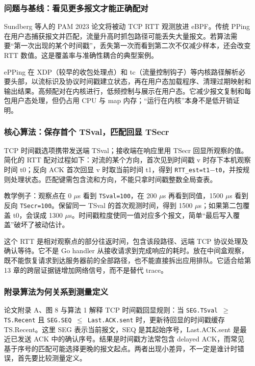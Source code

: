 \documentclass[UTF8,fontset=fandol,openany,11pt]{ctexbook}
\begin{document}
\subsubsection{问题与基线：看见更多报文才能正确配对}
Sundberg 等人的 PAM 2023 论文将被动 TCP RTT 观测放进 eBPF。传统 PPing 在用户态捕获报文并匹配，流量升高时抓包路径可能丢失大量报文。若算法需要“第一次出现的某个时间戳”，丢失第一次而看到第二次不仅减少样本，还会改变 RTT 数值。这是覆盖率与准确性耦合的典型案例。\cite{paper-epping}

ePPing 在 XDP（较早的收包处理点）和 tc（流量控制钩子）等内核路径解析必要头部，以流标识及协议时间戳建立状态，再在用户态加载程序、清理过期映射和输出结果。高频配对在内核进行，低频控制与展示在用户态。它减少报文复制和每包用户态处理，但仍占用 CPU 与 map 内存；“运行在内核”本身不是低开销证明。

\subsubsection{核心算法：保存首个 TSval，匹配回显 TSecr}
TCP 时间戳选项携带发送端 TSval；接收端在响应里用 TSecr 回显所观察的值。简化的 RTT 配对过程如下：对流的某个方向，首次见到时间戳 v 时存下本机观察时间 t0；反向 ACK 首次回显 v 时取当前时间 t1，得到 \texttt{RTT\_\allowbreak{}est=t1\ensuremath{-}t0}，并按规则处理状态。匹配键需包含流和方向，不能只拿时间戳整数全局查表。

教学例子：观察点在 0 \ensuremath{\mu}s 看到 \texttt{TSval=100}，在 200 \ensuremath{\mu}s 再看到同值，1500 \ensuremath{\mu}s 看到反向 \texttt{TSecr=100}。保留同一 TSval 的首次观测时间，得到 1500 \ensuremath{\mu}s；如果第二包覆盖 t0，会误成 1300 \ensuremath{\mu}s。时间戳粒度使同一值对应多个报文，简单“最后写入覆盖”破坏了被动估计。

这个 RTT 是相对观察点的部分往返时间，包含该段路径、远端 TCP 协议处理及确认等待。它不是 Go handler 从接收请求到完成响应的耗时。放在中间盒观察，既不能恢复请求到达服务器前的全部路径，也不能直接拆出应用排队。它适合给第 13 章的跨层证据链增加网络信号，而不是替代 trace。

\subsubsection{附录算法为何关系到测量定义}
论文附录 A、图 8 与算法 1 解释 TCP 时间戳回显规则：当 \texttt{SEG.\allowbreak{}TSval \ensuremath{\geq} TS.\allowbreak{}Recent} 且 \texttt{SEG.\allowbreak{}SEQ \ensuremath{\leq} Last.\allowbreak{}ACK.\allowbreak{}sent} 时，更新待回显的时间戳缓存 TS.Recent。这里 SEG 表示当前报文，SEQ 是其起始序号，Last.ACK.sent 是最近已发送 ACK 中的确认序号。结果是时间戳方法常包含 delayed ACK，而常见基于序号的匹配可能选择更晚的报文起点。两者出现小差异，不一定是谁计时错误，首先要比较测量定义。
\end{document}
